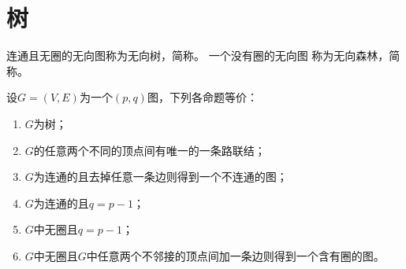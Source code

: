 \chapter{树}

\begin{Def}
    连通且无圈的无向图称为无向树，简称{}。 一个没有圈的无向图
    称为无向森林，简称{}。
  \end{Def}
  \begin{Thm}
  设$G=(V,E)$为一个$(p,q)$图，下列各命题等价：
  \begin{enumerate}
  \item $G$为树；
  \item $G$的任意两个不同的顶点间有唯一的一条路联结；
  \item $G$为连通的且去掉任意一条边则得到一个不连通的图；
  \item $G$为连通的且$q = p - 1$；
  \item $G$中无圈且$q = p - 1$；
  \item $G$中无圈且$G$中任意两个不邻接的顶点间加一条边则得到一个含有圈的图。
  \end{enumerate}
  \end{Thm}

